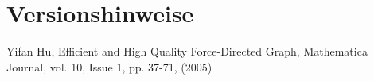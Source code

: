 \documentclass[12pt, a4paper]{article}
\begin{document}

\section{Versionshinweise}

\newpage
\begin{thebibliography}{9}
	 Yifan Hu, Efficient and High Quality Force-Directed Graph, Mathematica Journal, vol. 10, Issue 1, pp. 37-71, (2005)
\end{thebibliography}
\end{document}

